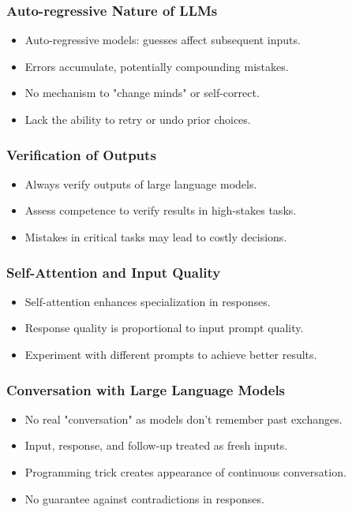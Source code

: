 \begin{frame}[fragile]\frametitle{Auto-regressive Nature of LLMs}
  \begin{itemize}
    \item Auto-regressive models: guesses affect subsequent inputs.
    \item Errors accumulate, potentially compounding mistakes.
    \item No mechanism to "change minds" or self-correct.
    \item Lack the ability to retry or undo prior choices.
  \end{itemize}
\end{frame}

\begin{frame}[fragile]\frametitle{Verification of Outputs}
\begin{itemize}
    \item Always verify outputs of large language models.
    \item Assess competence to verify results in high-stakes tasks.
    \item Mistakes in critical tasks may lead to costly decisions.
\end{itemize}
\end{frame}

\begin{frame}[fragile]\frametitle{Self-Attention and Input Quality}
\begin{itemize}
    \item Self-attention enhances specialization in responses.
    \item Response quality is proportional to input prompt quality.
    \item Experiment with different prompts to achieve better results.
\end{itemize}
\end{frame}

\begin{frame}[fragile]\frametitle{Conversation with Large Language Models}
\begin{itemize}
    \item No real "conversation" as models don't remember past exchanges.
    \item Input, response, and follow-up treated as fresh inputs.
    \item Programming trick creates appearance of continuous conversation.
    \item No guarantee against contradictions in responses.
\end{itemize}
\end{frame}

